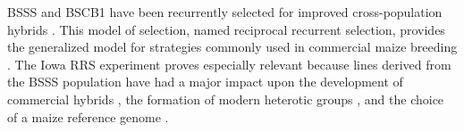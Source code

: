BSSS and BSCB1 have been recurrently selected for improved cross-population hybrids \citep{penny1971twenty}. 
This model of selection, named reciprocal recurrent selection, provides the generalized model for strategies commonly used in commercial maize breeding \citep{comstock1949breeding, duvick2004long}. 
The Iowa RRS experiment proves especially relevant because lines derived from the BSSS population have had a major impact upon the development of commercial hybrids \citep{duvick2004long, darrah19861985}, the formation of modern heterotic groups \citep{troyer1999background; senior1998utility}, and the choice of a maize reference genome \citep{schnable2009the-b73-maize}.